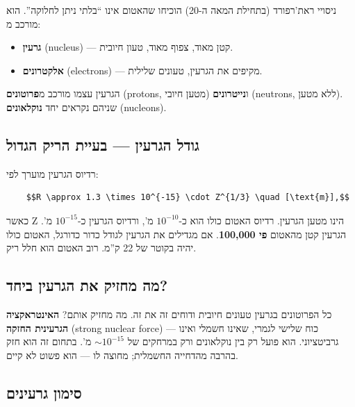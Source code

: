 \documentclass[
  hebrew,
  letterpaper,
  DIV=11,
  numbers=noendperiod]{scrreprt}
\providecommand{\tightlist}{%
  \setlength{\itemsep}{0pt}\setlength{\parskip}{0pt}}
\begin{document}
ניסויי ראת'רפורד (בתחילת המאה ה-20) הוכיחו שהאטום אינו ``בלתי ניתן
לחלוקה''. הוא מורכב מ:

\begin{itemize}
\tightlist
\item
  \textbf{גרעין} (nucleus) --- קטן מאוד, צפוף מאוד, טעון חיובית.
\item
  \textbf{אלקטרונים} (electrons) --- מקיפים את הגרעין, טעונים שלילית.
\end{itemize}

הגרעין עצמו מורכב מ\textbf{פרוטונים} (protons, מטען חיובי)
ו\textbf{נייטרונים} (neutrons, ללא מטען). שניהם נקראים יחד
\textbf{נוקלאונים} (nucleons).

\subsection{גודל הגרעין --- בעיית הריק
הגדול}\label{ux5d2ux5d5ux5d3ux5dc-ux5d4ux5d2ux5e8ux5e2ux5d9ux5df-ux5d1ux5e2ux5d9ux5d9ux5ea-ux5d4ux5e8ux5d9ux5e7-ux5d4ux5d2ux5d3ux5d5ux5dc}

רדיוס הגרעין מוערך לפי:

\begin{verbatim}
    $$R \approx 1.3 \times 10^{-15} \cdot Z^{1/3} \quad [\text{m}],$$
\end{verbatim}

כאשר Z הינו מטען הגרעין. רדיוס האטום כולו הוא כ-\(10^{-10}\) מ', ורדיוס
הגרעין כ-\(10^{-15}\) מ'. הגרעין קטן מהאטום \textbf{פי 100,000}. אם
מגדילים את הגרעין לגודל כדור כדורגל, האטום כולו יהיה בקוטר של 22 ק''מ.
רוב האטום הוא חלל ריק.

\subsection{מה מחזיק את הגרעין
ביחד?}\label{ux5deux5d4-ux5deux5d7ux5d6ux5d9ux5e7-ux5d0ux5ea-ux5d4ux5d2ux5e8ux5e2ux5d9ux5df-ux5d1ux5d9ux5d7ux5d3}

כל הפרוטונים בגרעין טעונים חיובית ודוחים זה את זה. מה מחזיק אותם?
\textbf{האינטראקציה הגרעינית החזקה} (strong nuclear force) --- כוח שלישי
לגמרי, שאינו חשמלי ואינו גרביטציוני. הוא פועל רק בין נוקלאונים ורק
במרחקים של \(\sim 10^{-15}\) מ'. בתחום זה הוא חזק בהרבה מהדחייה החשמלית;
מחוצה לו --- הוא פשוט לא קיים.

\subsection{סימון
גרעינים}\label{ux5e1ux5d9ux5deux5d5ux5df-ux5d2ux5e8ux5e2ux5d9ux5e0ux5d9ux5dd}
\end{document}
